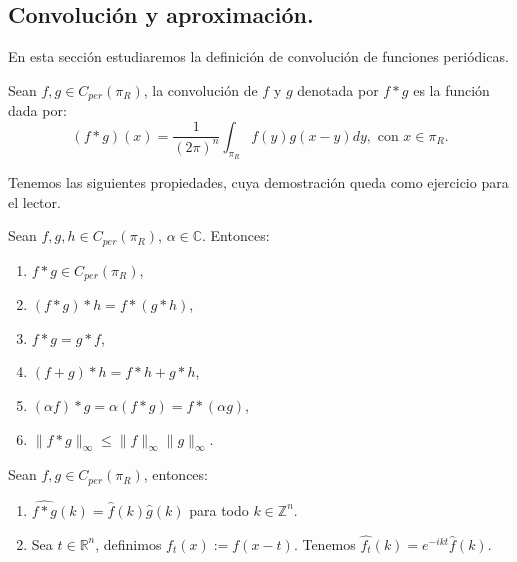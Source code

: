   \subsection{Convolución y aproximación.}
    En esta sección estudiaremos la definición de convolución de funciones periódicas.
    \begin{definition}
      Sean $f,g\in C_{per}(\pi_R)$, la convolución de $f$ y $g$ denotada por $f*g$ es la función dada por:
      \begin{equation}
        (f*g)(x)=\frac{1}{(2\pi)^{n}}\int_{\pi_R}f(y)g(x-y)dy,\text{ con $x\in\pi_R$.}\label{eq:convolución}  
      \end{equation}
    \end{definition}
    Tenemos las siguientes propiedades, cuya demostración queda como ejercicio para el lector.
    \begin{proposition}\label{proposition:2.16}
      Sean $f,g,h\in C_{per}(\pi_R)$, $\alpha\in\mathbb{C}$. Entonces:
      \begin{enumerate}
        \item $f*g\in C_{per}(\pi_R)$,
        \item $(f*g)*h=f*(g*h)$,
        \item $f*g=g*f$,
        \item $(f+g)*h=f*h+g*h$,
        \item $(\alpha f)*g=\alpha(f*g)=f*(\alpha g)$,
        \item $\|f*g\|_{\infty}\leq \|f\|_{\infty}\|g\|_{\infty}$.
      \end{enumerate}
    \end{proposition}
    \begin{proposition}
      Sean $f,g\in C_{per}(\pi_R)$, entonces:
      \begin{enumerate}
        \item $\hat{f*g}(k)=\hat{f}(k)\hat{g}(k)$ para todo $k\in\mathbb{Z}^{n}$.
        \item Sea $t\in\mathbb{R}^{n}$, definimos $f_t(x):=f(x-t)$. Tenemos $\hat{f_t}(k)=e^{-ikt}\hat{f}(k)$.
      \end{enumerate}
    \end{proposition}
